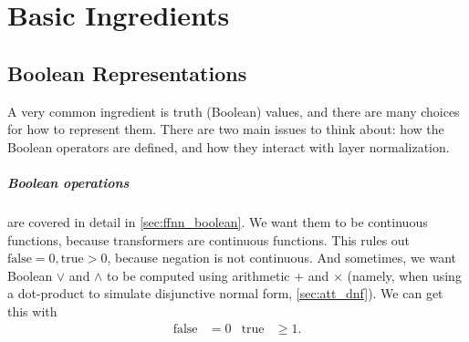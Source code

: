 %
\chapter{Basic Ingredients}
%



\section{Boolean Representations}
\label{sec:booleans}

A very common ingredient is truth (Boolean) values, and there are many choices for how to represent them.
There are two main issues to think about: how the Boolean operators are defined, and how they interact with layer normalization.

\paragraph{Boolean operations} are covered in detail in \cref{sec:ffnn_boolean}. We want them to be continuous functions, because transformers are continuous functions. This rules out $\text{false}=0, \text{true}>0$, because negation is not continuous.
And sometimes, we want Boolean $\lor$ and $\land$ to be computed using arithmetic $+$ and $\times$ (namely, when using a dot-product to simulate disjunctive normal form, \cref{sec:att_dnf}). We can get this with
\begin{align*}
  \text{false} &= 0 &\text{true} &\ge 1.
\end{align*}

